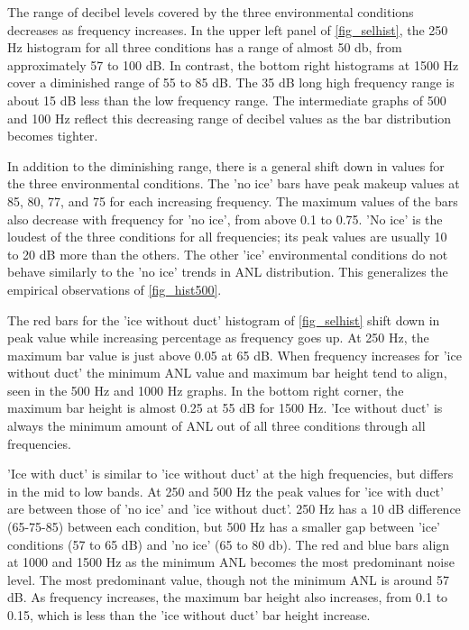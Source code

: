 The range of decibel levels covered by the three environmental conditions decreases as frequency increases. In the upper left panel of \autoref{fig_selhist}, the 250 Hz histogram for all three conditions has a range of almost 50 db, from approximately 57 to 100 dB. In contrast, the bottom right histograms at 1500 Hz cover a diminished range of 55 to 85 dB. The 35 dB long high frequency range is about 15 dB less than the low frequency range. The intermediate graphs of 500 and 100 Hz reflect this decreasing range of decibel values as the bar distribution becomes tighter.

In addition to the diminishing range, there is a general shift down in values for the three environmental conditions. The 'no ice' bars have peak makeup values at 85, 80, 77, and 75 for each increasing frequency. The maximum values of the bars also decrease with frequency for 'no ice', from above 0.1 to 0.75. 'No ice' is the loudest of the three conditions for all frequencies; its peak values are usually 10 to 20 dB more than the others. The other 'ice' environmental conditions do not behave similarly to the 'no ice' trends in ANL distribution. This generalizes the empirical observations of \autoref{fig_hist500}.

The red bars for the 'ice without duct' histogram of \autoref{fig_selhist} shift down in peak value while increasing percentage as frequency goes up. At 250 Hz, the maximum bar value is just above 0.05 at 65 dB. When frequency increases for 'ice without duct' the minimum ANL value and maximum bar height tend to align, seen in the 500 Hz and 1000 Hz graphs. In the bottom right corner, the maximum bar height is almost 0.25 at 55 dB for 1500 Hz. 'Ice without duct' is always the minimum amount of ANL out of all three conditions through all frequencies.

'Ice with duct' is similar to 'ice without duct' at the high frequencies, but differs in the mid to low bands. At 250 and 500 Hz the peak values for 'ice with duct' are between those of 'no ice' and 'ice without duct'. 250 Hz has a 10 dB difference (65-75-85) between each condition, but 500 Hz has a smaller gap between 'ice' conditions (57 to 65 dB) and 'no ice' (65 to 80 db). The red and blue bars align at 1000 and 1500 Hz as the minimum ANL becomes the most predominant noise level. The most predominant value, though not the minimum ANL is around 57 dB. As frequency increases, the maximum bar height also increases, from 0.1 to 0.15, which is less than the 'ice without duct' bar height increase.

